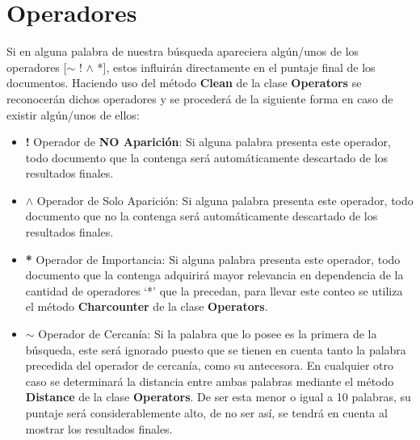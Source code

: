 \documentclass{article}
\begin{document}
\section{Operadores}
Si en alguna palabra de nuestra búsqueda apareciera algún/unos de los operadores
	[$\sim $ ! $\wedge$ *], estos influirán directamente en el puntaje final de los documentos.
Haciendo uso del método \textbf{Clean} de la clase \textbf{Operators} se reconocerán dichos operadores y se
procederá de la siguiente forma en caso de existir algún/unos de ellos:
\begin{itemize}
	\item \textbf{!} Operador de \textbf{NO Aparición}: Si alguna palabra presenta este operador, todo documento que
	      la contenga será automáticamente descartado de los resultados finales.
	\item \textbf{$\wedge$} Operador de Solo Aparición: Si alguna palabra presenta este operador, todo documento que no
	      la contenga será automáticamente descartado de los resultados finales.
	\item \textbf{*} Operador de Importancia: Si alguna palabra presenta este operador, todo documento que
	      la contenga adquirirá mayor relevancia en dependencia de la cantidad de operadores ‘*’ que la
	      precedan, para llevar este conteo se utiliza el método \textbf{Charcounter} de la clase \textbf{Operators}.
	\item \textbf{$\sim $} Operador de Cercanía: Si la palabra que lo posee es la primera de
	      la búsqueda, este será ignorado puesto que se tienen en cuenta tanto la palabra
	      precedida del operador de cercanía, como su antecesora. En cualquier otro caso se
	      determinará la distancia entre ambas palabras mediante el método \textbf{Distance} de la
	      clase \textbf{Operators}. De ser esta menor o igual a 10 palabras, su puntaje será
	      considerablemente alto, de no ser así, se tendrá en cuenta al mostrar los
	      resultados finales.
\end{itemize}

\newpage
\end{document}
